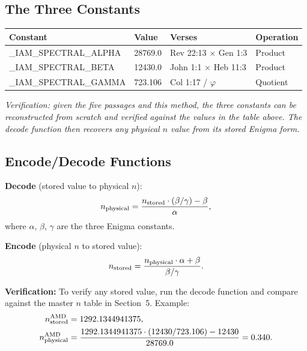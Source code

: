\documentclass[12pt,a4paper]{article}
\begin{document}
\subsection{The Three Constants}

\begin{center}
\begin{tabular}{llll}
\toprule
\textbf{Constant} & \textbf{Value} & \textbf{Verses} & \textbf{Operation} \\
\midrule
\_IAM\_SPECTRAL\_ALPHA & 28769.0 & Rev 22:13 $\times$ Gen 1:3 & Product \\
\_IAM\_SPECTRAL\_BETA & 12430.0 & John 1:1 $\times$ Heb 11:3 & Product \\
\_IAM\_SPECTRAL\_GAMMA & 723.106 & Col 1:17 / $\varphi$ & Quotient \\
\bottomrule
\end{tabular}
\end{center}

\noindent
\textit{Verification: given the five passages and this method, the three
constants can be reconstructed from scratch and verified against the values
in the table above. The decode function then recovers any physical $n$ value
from its stored Enigma form.}

\subsection{Encode/Decode Functions}

\textbf{Decode} (stored value to physical $n$):
\begin{equation}
n_{\rm physical} = \frac{n_{\rm stored} \cdot (\beta/\gamma) - \beta}{\alpha},
\end{equation}
where $\alpha$, $\beta$, $\gamma$ are the three Enigma constants.

\textbf{Encode} (physical $n$ to stored value):
\begin{equation}
n_{\rm stored} = \frac{n_{\rm physical} \cdot \alpha + \beta}{\beta/\gamma}.
\end{equation}

\textbf{Verification:} To verify any stored value, run the decode function
and compare against the master $n$ table in Section~5. Example:
\begin{align}
n_{\rm stored}^{\rm AMD} &= 1292.1344941375,\\
n_{\rm physical}^{\rm AMD} &= \frac{1292.1344941375 \cdot (12430/723.106) - 12430}{28769.0} = 0.340.
\end{align}
\end{document}
